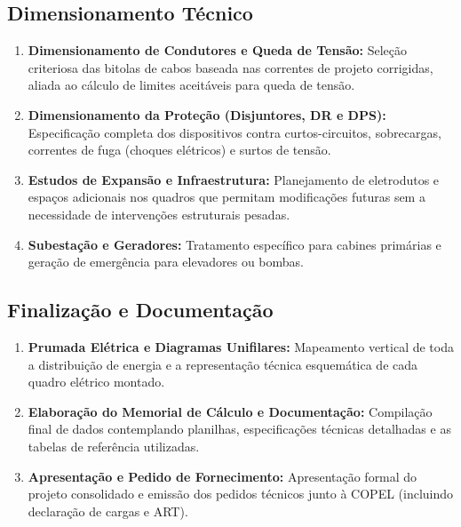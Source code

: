 \documentclass[12pt,openright,oneside,a4paper,brazil]{abntex2}
\begin{document}
\subsection{Dimensionamento Técnico}
\begin{enumerate} [start=9]
    \item \textbf{Dimensionamento de Condutores e Queda de Tensão: } Seleção criteriosa das bitolas de cabos baseada nas correntes de projeto corrigidas, aliada ao cálculo de limites aceitáveis para queda de tensão.
    
    \item \textbf{Dimensionamento da Proteção (Disjuntores, DR e DPS): } Especificação completa dos dispositivos contra curtos-circuitos, sobrecargas, correntes de fuga (choques elétricos) e surtos de tensão.
    
    \item \textbf{Estudos de Expansão e Infraestrutura: } Planejamento de eletrodutos e espaços adicionais nos quadros que permitam modificações futuras sem a necessidade de intervenções estruturais pesadas.
    
    \item \textbf{Subestação e Geradores: } Tratamento específico para cabines primárias e geração de emergência para elevadores ou bombas.
\end{enumerate}

\subsection{Finalização e Documentação}
\begin{enumerate}[start=13]
    \item \textbf{Prumada Elétrica e Diagramas Unifilares: } Mapeamento vertical de toda a distribuição de energia e a representação técnica esquemática de cada quadro elétrico montado.
    
    \item \textbf{Elaboração do Memorial de Cálculo e Documentação: } Compilação final de dados contemplando planilhas, especificações técnicas detalhadas e as tabelas de referência utilizadas.
    
    \item \textbf{Apresentação e Pedido de Fornecimento: } Apresentação formal do projeto consolidado e emissão dos pedidos técnicos junto à COPEL (incluindo declaração de cargas e ART).
\end{enumerate}
\end{document}
